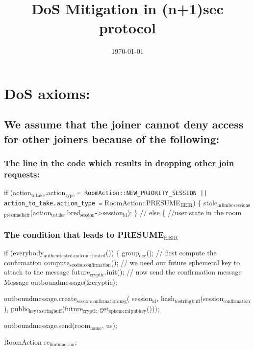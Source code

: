 \documentclass[11pt]{article}
\date{\today}
\title{DoS Mitigation in (n+1)sec protocol}
\begin{document}
\maketitle
\tableofcontents

\section{DoS axioms:}
\label{sec-1}
\subsection{We assume that the joiner cannot deny access for other joiners because of the following:}
\label{sec-1-1}
\subsubsection{The line in the code which results in dropping other join requests:}
\label{sec-1-1-1}
   if (action$_{\text{to}}$$_{\text{take}}$.action$_{\text{type}}$ \texttt{= RoomAction::NEW\_PRIORITY\_SESSION ||
            action\_to\_take.action\_type =} RoomAction::PRESUME$_{\text{HEIR}}$) \{
    stale$_{\text{in}}$$_{\text{limbo}}$$_{\text{sessions}}$$_{\text{presume}}$$_{\text{heir}}$(action$_{\text{to}}$$_{\text{take}}$.bred$_{\text{session}}$->session$_{\text{id}}$);
\} // else \{ //user state in the room

\subsubsection{The condition that leads to PRESUME$_{\text{HEIR}}$}
\label{sec-1-1-2}
if (everybody$_{\text{authenticated}}$$_{\text{and}}$$_{\text{contributed}}$()) \{
    group$_{\text{dec}}$();
    // first compute the confirmation
    compute$_{\text{session}}$$_{\text{confirmation}}$();
    // we need our future ephemeral key to attach to the message
    future$_{\text{cryptic}}$.init();
    // now send the confirmation message
    Message outboundmessage(\&cryptic);

outboundmessage.create$_{\text{session}}$$_{\text{confirmation}}$$_{\text{msg}}$(
    session$_{\text{id}}$, hash$_{\text{to}}$$_{\text{string}}$$_{\text{buff}}$(session$_{\text{confirmation}}$),
    public$_{\text{key}}$$_{\text{to}}$$_{\text{stringbuff}}$(future$_{\text{cryptic}}$.get$_{\text{ephemeral}}$$_{\text{pub}}$$_{\text{key}}$()));

outboundmessage.send(room$_{\text{name}}$, us);

RoomAction re$_{\text{limbo}}$$_{\text{action}}$;
\end{document}
